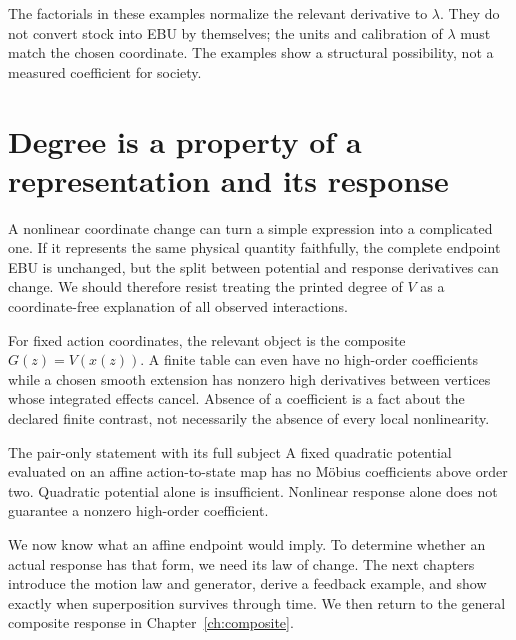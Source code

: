 The factorials in these examples normalize the relevant derivative to $\lambda$. They do not convert stock into EBU by themselves; the units and calibration of $\lambda$ must match the chosen coordinate. The examples show a structural possibility, not a measured coefficient for society.

\section{Degree is a property of a representation and its response}
A nonlinear coordinate change can turn a simple expression into a complicated one. If it represents the same physical quantity faithfully, the complete endpoint EBU is unchanged, but the split between potential and response derivatives can change. We should therefore resist treating the printed degree of $V$ as a coordinate-free explanation of all observed interactions.

For fixed action coordinates, the relevant object is the composite $G(z)=V(x(z))$. A finite table can even have no high-order coefficients while a chosen smooth extension has nonzero high derivatives between vertices whose integrated effects cancel. Absence of a coefficient is a fact about the declared finite contrast, not necessarily the absence of every local nonlinearity.

\begin{lawbox}{The pair-only statement with its full subject}
A fixed quadratic potential evaluated on an affine action-to-state map has no Möbius coefficients above order two. Quadratic potential alone is insufficient. Nonlinear response alone does not guarantee a nonzero high-order coefficient.
\end{lawbox}

We now know what an affine endpoint would imply. To determine whether an actual response has that form, we need its law of change. The next chapters introduce the motion law and generator, derive a feedback example, and show exactly when superposition survives through time. We then return to the general composite response in Chapter~\ref{ch:composite}.
